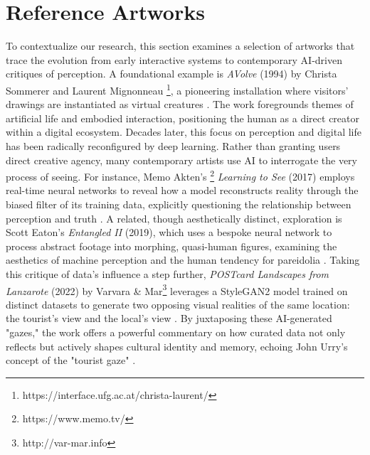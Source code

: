 \documentclass[sigconf,nonacm]{acmart}
\begin{document}
\section{Reference Artworks}

To contextualize our research, this section examines a selection of artworks that trace the evolution from early interactive systems to contemporary AI-driven critiques of perception. A foundational example is \textit{A\textendash Volve} (1994) by Christa Sommerer and Laurent Mignonneau \footnote{https://interface.ufg.ac.at/christa-laurent/}, a pioneering installation where visitors' drawings are instantiated as virtual creatures \cite{AVolve}. The work foregrounds themes of artificial life and embodied interaction, positioning the human as a direct creator within a digital ecosystem. Decades later, this focus on perception and digital life has been radically reconfigured by deep learning. Rather than granting users direct creative agency, many contemporary artists use AI to interrogate the very process of seeing. For instance, Memo Akten's \footnote{https://www.memo.tv/} \textit{Learning to See} (2017) employs real-time neural networks to reveal how a model reconstructs reality through the biased filter of its training data, explicitly questioning the relationship between perception and truth \cite{LearningToSeeWeb,LearningToSeePaper}. A related, though aesthetically distinct, exploration is Scott Eaton's \textit{Entangled II} (2019), which uses a bespoke neural network to process abstract footage into morphing, quasi-human figures, examining the aesthetics of machine perception and the human tendency for pareidolia \cite{EntangledII}. Taking this critique of data's influence a step further, \textit{POSTcard Landscapes from Lanzarote} (2022) by Varvara \& Mar\footnote{http://var-mar.info} leverages a StyleGAN2 model trained on distinct datasets to generate two opposing visual realities of the same location: the tourist's view and the local's view \cite{Guljajeva2022}. By juxtaposing these AI-generated "gazes," the work offers a powerful commentary on how curated data not only reflects but actively shapes cultural identity and memory, echoing John Urry's concept of the "tourist gaze" \cite{Urry2002}. 
\end{document}
